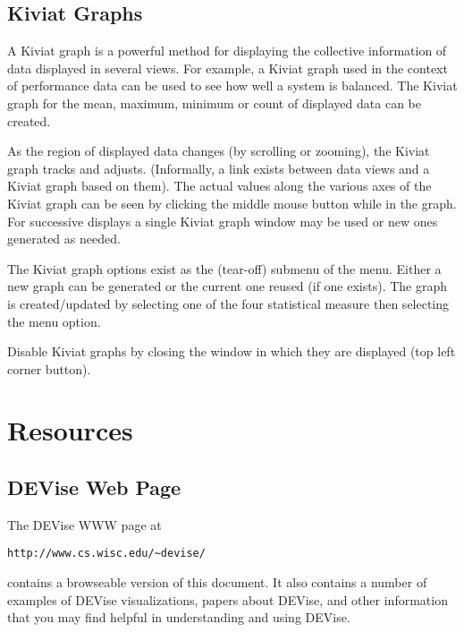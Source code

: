 \subsection{Kiviat Graphs}

A Kiviat graph is a powerful method for displaying the collective information of
data displayed in several views. For example, a Kiviat graph used in the context
of performance data can be used to see how well a system is balanced. The Kiviat
graph for the mean, maximum, minimum or count of displayed data can be created.

As the region of displayed data changes (by scrolling or zooming), the Kiviat
graph tracks and adjusts. (Informally, a link exists between data views and a
Kiviat graph based on them). The actual values along the various axes of the
Kiviat graph can be seen by clicking the middle mouse button while in the
graph. For successive displays a single Kiviat graph window may be used or new
ones generated as needed.

The Kiviat graph options exist as the (tear-off)  submenu of
the  menu. Either a new graph can be generated or the current one
reused (if one exists). The graph is created/updated by selecting one of the
four statistical measure then selecting the  menu option.

Disable Kiviat graphs by closing the window in which they are displayed (top
left corner button).


\section{Resources}

\subsection{DEVise Web Page}


The DEVise WWW page at
\begin{verbatim}
http://www.cs.wisc.edu/~devise/
\end{verbatim}
contains a
browseable version of this document.  It also contains a number of examples
of DEVise visualizations, papers about DEVise, and other information that
you may find helpful in understanding and using DEVise.

